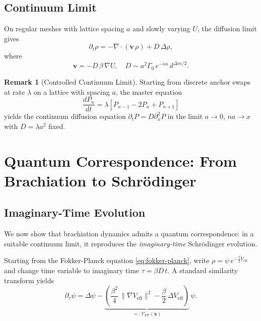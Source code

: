 \documentclass[11pt]{article}
\theoremstyle{plain}
\theoremstyle{definition}
\newtheorem{remark}[theorem]{Remark}
\begin{document}
\subsection{Continuum Limit}

On regular meshes with lattice spacing $a$ and slowly varying $U$, the diffusion limit gives
\begin{equation}
  \partial_t \rho = -\nabla\cdot(\mathbf{v}\,\rho) + D\,\Delta \rho,
  \label{eq:fokker-planck}
\end{equation}
where
\[
  \mathbf{v} = -D\,\beta\,\nabla U, \quad D \sim a^2 \Gamma_0\,e^{-\kappa a}\, d^{\Delta m/2}.
\]

\begin{remark}[Controlled Continuum Limit]
  Starting from discrete anchor swaps at rate $\lambda$ on a lattice with spacing $a$, the master equation
  \begin{equation}
    \frac{dP_n}{dt} = \lambda [P_{n-1} - 2P_n + P_{n+1}]
  \end{equation}
  yields the continuum diffusion equation $\partial_t P = D \partial_x^2 P$ in the limit $a\to 0$, $na \to x$ with $D = \lambda a^2$ fixed.
\end{remark}

\section{Quantum Correspondence: From Brachiation to Schrödinger}
\label{sec:quantum-correspondence}

\subsection{Imaginary-Time Evolution}

We now show that brachiation dynamics admits a quantum correspondence: in a suitable continuum limit, it reproduces the \emph{imaginary-time} Schrödinger evolution.

Starting from the Fokker-Planck equation \eqref{eq:fokker-planck}, write $\rho = \psi\,e^{-\frac{\beta}{2} V_{\mathrm{eff}}}$ and change time variable to imaginary time $\tau = \beta D\, t$. A standard similarity transform yields
\begin{equation}
  \partial_\tau \psi = \Delta \psi - \underbrace{\left(\frac{\beta^2}{4}\,\|\nabla V_{\mathrm{eff}}\|^2 - \frac{\beta}{2}\,\Delta V_{\mathrm{eff}}\right)}_{=:\mathcal{V}_{\mathrm{FP}}(\mathbf{x})}\, \psi.
  \label{eq:imag-time-FP}
\end{equation}
\end{document}
